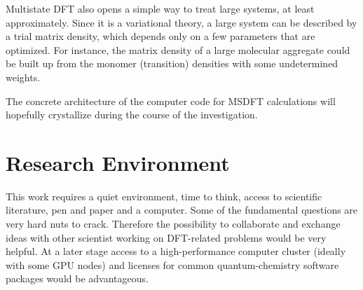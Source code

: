 \documentclass[12pt]{article}
\begin{document}

\vspace{10px}
Multistate DFT also opens a simple way to treat large systems, at least approximately. Since it is a variational theory, a large system can be described by a trial matrix density, which depends only on a few parameters that are optimized. For instance, the matrix density of a large molecular aggregate could be built up from the monomer (transition) densities with some undetermined weights.

The concrete architecture of the computer code for MSDFT calculations will hopefully crystallize during the course of the investigation.

\section{Research Environment}
This work requires a quiet environment, time to think, access to scientific literature, pen and paper and a computer.
Some of the fundamental questions are very hard nuts to crack. Therefore the possibility to collaborate and exchange ideas with other scientist working on DFT-related problems would be very helpful.
At a later stage access to a high-performance computer cluster (ideally with some GPU nodes) and licenses for common quantum-chemistry software packages would be advantageous. 



\end{document}
